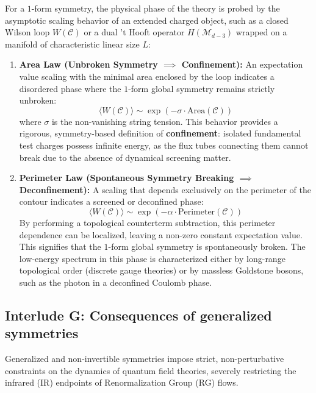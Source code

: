 \documentclass[aps,preprint,nofootinbib,preprintnumbers,eqsecnum,superscriptaddress]{revtex4}
\numberwithin{equation}{section}
\begin{document}
For a $1$-form symmetry, the physical phase of the theory is probed by the asymptotic scaling behavior of an extended charged object, such as a closed Wilson loop $W(\mathcal{C})$ or a dual 't Hooft operator $H(\mathcal{M}_{d-3})$ wrapped on a manifold of characteristic linear size $L$:
\begin{enumerate}[\itshape i)]
    \item \textbf{Area Law (Unbroken Symmetry $\implies$ Confinement):} An expectation value scaling with the minimal area enclosed by the loop indicates a disordered phase where the $1$-form global symmetry remains strictly unbroken:
    \begin{equation}
        \langle W(\mathcal{C}) \rangle \sim \exp\left( -\sigma \cdot \text{Area}(\mathcal{C}) \right)
    \end{equation}
    where $\sigma$ is the non-vanishing string tension. This behavior provides a rigorous, symmetry-based definition of \textbf{confinement}: isolated fundamental test charges possess infinite energy, as the flux tubes connecting them cannot break due to the absence of dynamical screening matter.
    \item \textbf{Perimeter Law (Spontaneous Symmetry Breaking $\implies$ Deconfinement):} A scaling that depends exclusively on the perimeter of the contour indicates a screened or deconfined phase:
    \begin{equation}
        \langle W(\mathcal{C}) \rangle \sim \exp\left( -\alpha \cdot \text{Perimeter}(\mathcal{C}) \right)
    \end{equation}
    By performing a topological counterterm subtraction, this perimeter dependence can be localized, leaving a non-zero constant expectation value. This signifies that the $1$-form global symmetry is spontaneously broken. The low-energy spectrum in this phase is characterized either by long-range topological order (discrete gauge theories) or by massless Goldstone bosons, such as the photon in a deconfined Coulomb phase.
\end{enumerate}

\subsection{Interlude G: Consequences of generalized symmetries} 
\label{sec:consequences_of_gensym}

Generalized and non-invertible symmetries impose strict, non-perturbative constraints on the dynamics of quantum field theories, severely restricting the infrared (IR) endpoints of Renormalization Group (RG) flows.
\end{document}
